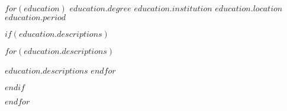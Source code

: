 
\begin{cventries}
  $for(education)$
    \cventry
      {$education.degree$}
      {$education.institution$}
      {$education.location$}
      {$education.period$}
      {$if(education.descriptions)$
        \begin{cvitems}
          $for(education.descriptions)$
            \item {$education.descriptions$}
          $endfor$
        \end{cvitems}
      $endif$}
      
  $endfor$
\end{cventries}
